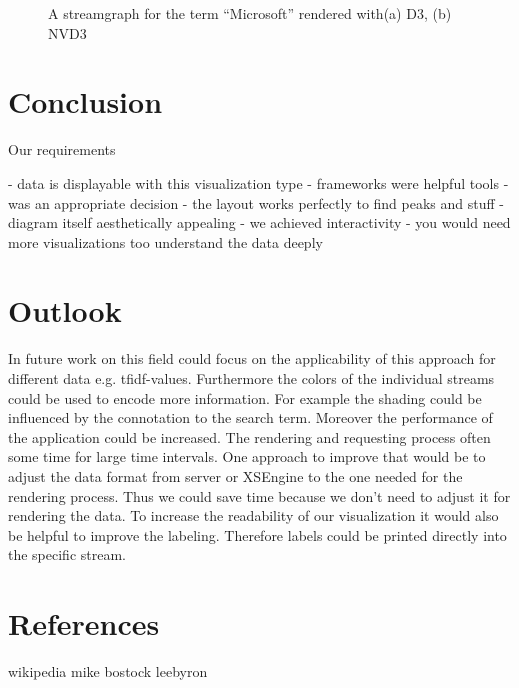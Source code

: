 \documentclass{llncs}
\begin{document}
\begin{figure}
			
    \caption{A streamgraph for the term ``Microsoft'' rendered with(a) D3, (b) NVD3}
\end{figure}



\section{Conclusion}
Our requirements 

- data is displayable with this visualization type
- frameworks were helpful tools
- was an appropriate decision
- the layout works perfectly to find peaks and stuff
- diagram itself aesthetically appealing 
- we achieved interactivity 
- you would need more visualizations too understand the data deeply

\section{Outlook}
In future work on this field could focus on the applicability of this approach for different data e.g. tfidf-values.
Furthermore the colors of the individual streams could be used to encode more information. For example the shading could be influenced by the connotation to the search term.
Moreover the performance of the application could be increased. The rendering and requesting process often some time for large time intervals. One approach to improve that would be to adjust the data format from server or XSEngine to the one needed for the rendering process. Thus we could save time because we don't need to adjust it for rendering the data.
To increase the readability of our visualization it would also be helpful to improve the labeling. Therefore labels could be printed directly into the specific stream.

\section{References}
wikipedia
mike bostock
leebyron
\end{document}
